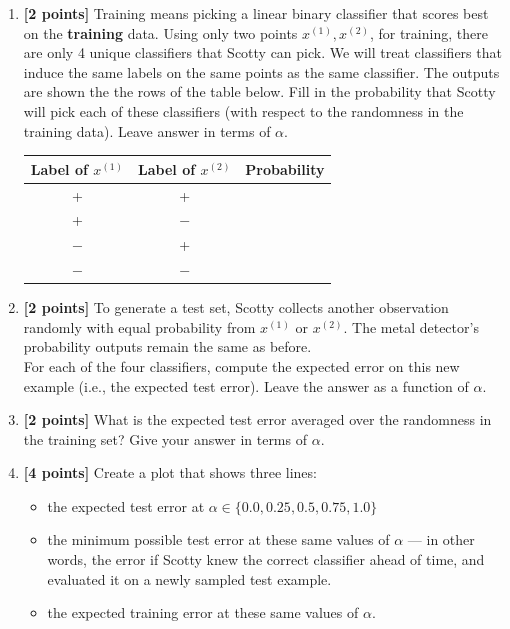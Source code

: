 \begin{enumerate}

\item {\bf [2 points]} Training means picking a linear binary classifier that scores best on the \textbf{training} data. Using only two points $x^{(1)},x^{(2)}$, for training, there are only 4 unique classifiers that Scotty can pick. We will treat classifiers that induce the same labels on the same points as the same classifier. The outputs are shown the the rows of the table below. Fill in the probability that Scotty will pick each of these classifiers (with respect to the randomness in the training data). Leave answer in terms of $\alpha$.
\begin{table}[ht]
\begin{center}
\begin{tabular}{||c c c||} 
 \hline
 Label of $x^{(1)}$ & Label of $x^{(2)}$ & Probability  \\ [0.5ex] 
 \hline\hline
 + & +  & \\ 
 \hline
 + & $-$ & \\
 \hline
 $-$ & + &  \\
 \hline
 $-$ & $-$ &\\
 \hline
\end{tabular}
\end{center}
\end{table}


\item {\bf [2 points]}
To generate a test set, Scotty collects another observation randomly with equal probability from $x^{(1)}$ or $x^{(2)}$. The metal detector's probability outputs remain the same as before. \\
For each of the four classifiers, compute the expected error on this new example (i.e., the expected test error). Leave the answer as a function of $\alpha$.
\begin{tcolorbox}[fit,height=5cm, width=0.9\textwidth, blank, borderline={1pt}{-2pt}]
\end{tcolorbox}


\item {\bf [2 points]}
What is the expected test error averaged over the randomness in the training set? Give your answer in terms of $\alpha$.
\begin{tcolorbox}[fit,height=2.5cm, width=0.9\textwidth, blank, borderline={1pt}{-2pt}]
\end{tcolorbox}

\newpage

\item {\bf [4 points]}
Create a plot that shows three lines:
\begin{itemize}
    \item the expected test error at $\alpha\in \{0.0, 0.25, 0.5, 0.75, 1.0\}$
    \item the minimum possible test error at these same values of $\alpha$ — in other words, the error if Scotty knew the correct classifier ahead of time, and evaluated it on a newly sampled test example.
    \item the expected training error at these same values of $\alpha$.
\end{itemize}


\end{enumerate}
